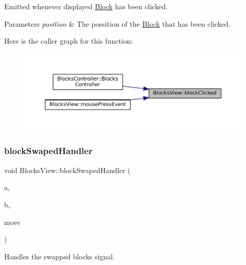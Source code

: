 Emitted whenever displayed \mbox{\hyperlink{class_block}{Block}} has been clicked. 


\begin{DoxyParams}{Parameters}
{\em position} & The possition of the \mbox{\hyperlink{class_block}{Block}} that has been clicked. \\
\hline
\end{DoxyParams}
Here is the caller graph for this function\+:
\nopagebreak
\begin{figure}[H]
\begin{center}
\leavevmode
\includegraphics[width=350pt]{class_blocks_view_ace9e48402539d2e3945ce794d7ae7dd9_icgraph}
\end{center}
\end{figure}
\mbox{\label{class_blocks_view_ad7f8487f26dd09d0058e8774f5f443b4}} 
\subsubsection{\texorpdfstring{blockSwapedHandler}{blockSwapedHandler}}
{\footnotesize\ttfamily void Blocks\+View\+::block\+Swaped\+Handler (\begin{DoxyParamCaption}\item[{\mbox{\hyperlink{class_block}{Block}}$<$ \mbox{\hyperlink{class_block_layout_item}{Block\+Layout\+Item}} $>$ \&}]{a,  }\item[{\mbox{\hyperlink{class_block}{Block}}$<$ \mbox{\hyperlink{class_block_layout_item}{Block\+Layout\+Item}} $>$ \&}]{b,  }\item[{const std\+::shared\+\_\+ptr$<$ \mbox{\hyperlink{struct_move}{Move}} $>$ \&}]{move }\end{DoxyParamCaption})\hspace{0.3cm}{\ttfamily [slot]}}



Handles the swapped blocks signal. 



